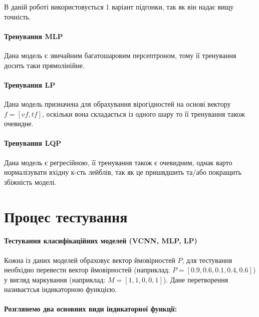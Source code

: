 \documentclass{udstu}
\begin{document}
В даній роботі використовується 1 варіант підгонки, так як він надає вищу точність.


\paragraph{\textbf{Тренування MLP}\\}

Дана модель є звичайним багатошаровим персептроном, тому її тренування досить таки прямолінійне.


\paragraph{\textbf{Тренування LP}\\}

Дана модель призначена для обрахування вірогідностей на основі вектору $f = [vf, tf]$, оскільки вона
складається із одного шару то її тренування також очевидне.


\paragraph{\textbf{Тренування LQP}\\}

Дана модель є регресійною, її тренування також є очевидним, однак варто нормалізувати
вхідну к-сть лейблів, так як це пришвдшить та/або покращить збіжність моделі.


\section{Процес тестування}

\paragraph{\textbf{Тестування класифікаційних моделей (VCNN, MLP, LP)}\\}

Кожна із даних моделей обраховує вектор ймовірностей $P$,
для тестування необхідно перевести вектор ймовірностей (наприклад: $P = [0.9, 0.6, 0.1, 0.4, 0.6]$)
у вигляд маркування (наприклад: $M = [1,1,0,0,1]$). Дане перетворення називаєтсья індикаторною функцією.

\paragraph{Розглянемо два основних види індикаторної функції:}
\end{document}
